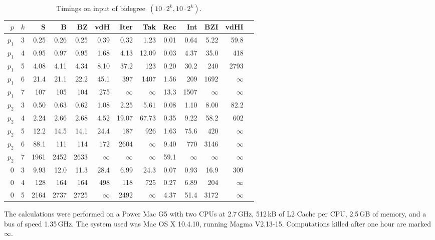 \documentclass{sig-alt-full}
\begin{document}
\begin{table}[ht]
\begin{small}
\begin{center}
\setlength{\tabcolsep}{2.25pt}
\begin{tabular}{rr|rrr|rrr|rrrrr}
$p$ & $k$ & S & B & BZ & vdH & Iter & Tak & Rec & Int & BZI & vdHI \\
\hline
$p_1$ & 3 & 0.25 & 0.26 & 0.25 & 0.39 & 0.32 & 1.23 & 0.01 & 0.64 & 5.22 & 59.8 \\
$p_1$ & 4 & 0.95 & 0.97 & 0.95 & 1.68 & 4.13 & 12.09 & 0.03 & 4.37 & 35.0 & 418 \\
$p_1$ & 5 & 4.08 & 4.11 & 4.34 & 8.10 & 37.2 & 123 & 0.20 & 30.2 & 240 & 2793 \\
$p_1$ & 6 & 21.4 & 21.1 & 22.2 & 45.1 & 397 & 1407 & 1.56 & 209 & 1692 & $\infty$ \\
$p_1$ & 7 & 107 & 105 & 104 & 275 & $\infty$ & $\infty$ & 13.3 & 1507 & $\infty$ & $\infty$ \\
\hline
$p_2$ & 3 & 0.50 & 0.63 & 0.62 & 1.08 & 2.25 & 5.61 & 0.08 & 1.10 & 8.00 & 82.2 \\
$p_2$ & 4 & 2.24 & 2.66 & 2.68 & 4.52 & 19.07 & 67.73 & 0.35 & 9.22 & 58.2 & 602 \\
$p_2$ & 5 & 12.2 & 14.5 & 14.1 & 24.4 & 187 & 926 & 1.63 & 75.6 & 420 & $\infty$ \\
$p_2$ & 6 & 88.1 & 111 & 114 & 172 & 2604 & $\infty$ & 9.40 & 770 & 3146 & $\infty$ \\
$p_2$ & 7 & 1961 & 2452 & 2633 & $\infty$ & $\infty$ & $\infty$ & 59.1 & $\infty$ & $\infty$ & $\infty$ \\
\hline
0 & 3 & 9.93 & 12.0 & 11.3 & 28.4 & 6.99 & 24.3 & 0.07 & 0.93 & 16.9 & 309 \\
0 & 4 & 128 & 164 & 164 & 498 & 118 & 725 & 0.27 & 6.89 & 204 & $\infty$ \\
0 & 5 & 2164 & 2737 & 2725 & $\infty$ & 2492 & $\infty$ & 4.37 & 51.4 & 3172 & $\infty$
\end{tabular}
\caption{\label{table:exp}Timings on input of bidegree~$(10\cdot2^k,10\cdot2^k)$.}
\end{center}
\end{small}
\end{table}
\vskip-7pt

The calculations were performed on a Power Mac G5 with two CPUs at 2.7\,GHz, 512\,kB of L2 Cache per CPU, 2.5\,GB of memory, and a bus of speed 1.35\,GHz.
The system used was Mac OS X 10.4.10, running Magma V2.13-15.
Computations killed after one hour are marked~$\infty$.
\end{document}
